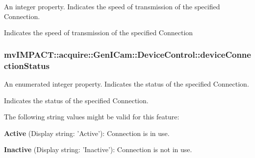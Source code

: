 An integer property. Indicates the speed of transmission of the specified Connection. 

Indicates the speed of transmission of the specified Connection \hypertarget{classmv_i_m_p_a_c_t_1_1acquire_1_1_gen_i_cam_1_1_device_control_a68a59391330be62153347f31044a8b5e}{
\subsubsection[{device\+Connection\+Status}]{ mv\+I\+M\+P\+A\+C\+T\+::acquire\+::\+Gen\+I\+Cam\+::\+Device\+Control\+::device\+Connection\+Status}}\label{classmv_i_m_p_a_c_t_1_1acquire_1_1_gen_i_cam_1_1_device_control_a68a59391330be62153347f31044a8b5e}


An enumerated integer property. Indicates the status of the specified Connection. 

Indicates the status of the specified Connection.

The following string values might be valid for this feature\+:
\begin{DoxyItemize}
\item {\bfseries Active} (Display string\+: 'Active')\+: Connection is in use.
\item {\bfseries Inactive} (Display string\+: 'Inactive')\+: Connection is not in use.
\end{DoxyItemize}

